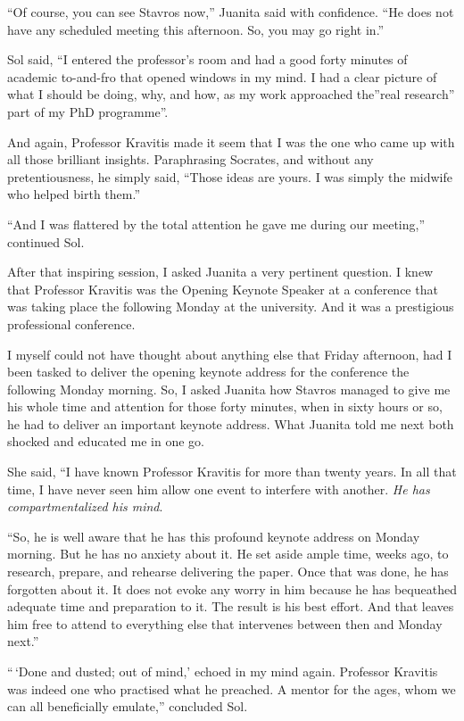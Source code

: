 \documentclass[
  a4paper,
]{article}
\begin{document}
``Of course, you can see Stavros now,'' Juanita said with confidence.
``He does not have any scheduled meeting this afternoon. So, you may go
right in.''

Sol said, ``I entered the professor's room and had a good forty minutes
of academic to-and-fro that opened windows in my mind. I had a clear
picture of what I should be doing, why, and how, as my work approached
the''real research'' part of my PhD programme''.

And again, Professor Kravitis made it seem that I was the one who came
up with all those brilliant insights. Paraphrasing Socrates, and without
any pretentiousness, he simply said, ``Those ideas are yours. I was
simply the midwife who helped birth them.''

``And I was flattered by the total attention he gave me during our
meeting,'' continued Sol.

After that inspiring session, I asked Juanita a very pertinent question.
I knew that Professor Kravitis was the Opening Keynote Speaker at a
conference that was taking place the following Monday at the university.
And it was a prestigious professional conference.

I myself could not have thought about anything else that Friday
afternoon, had I been tasked to deliver the opening keynote address for
the conference the following Monday morning. So, I asked Juanita how
Stavros managed to give me his whole time and attention for those forty
minutes, when in sixty hours or so, he had to deliver an important
keynote address. What Juanita told me next both shocked and educated me
in one go.

She said, ``I have known Professor Kravitis for more than twenty years.
In all that time, I have never seen him allow one event to interfere
with another. \emph{He has compartmentalized his mind}.

``So, he is well aware that he has this profound keynote address on
Monday morning. But he has no anxiety about it. He set aside ample time,
weeks ago, to research, prepare, and rehearse delivering the paper. Once
that was done, he has forgotten about it. It does not evoke any worry in
him because he has bequeathed adequate time and preparation to it. The
result is his best effort. And that leaves him free to attend to
everything else that intervenes between then and Monday next.''

``\,`Done and dusted; out of mind,' echoed in my mind again. Professor
Kravitis was indeed one who practised what he preached. A mentor for the
ages, whom we can all beneficially emulate,'' concluded Sol.
\end{document}
